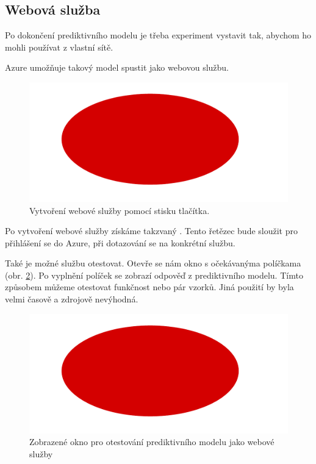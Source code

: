 \documentclass[thesis=M,czech]{FITthesis}[2012/10/20]
\begin{document}
		\subsection{Webová služba}
			Po dokončení prediktivního modelu je třeba experiment vystavit tak, abychom ho mohli používat z vlastní sítě.
			
			Azure umožňuje takový model spustit jako webovou službu.
			
			  \begin{figure}[htb]\centering
			  	\includegraphics[width=\textwidth]{./img/todo}
			  	\caption{Vytvoření webové služby pomocí stisku tlačítka.}
			  	\label{fig:azure_create_web_servise}
			  \end{figure}
		  
		  Po vytvoření webové služby získáme takzvaný . Tento řetězec bude sloužit pro přihlášení se do Azure, při dotazování se na konkrétní službu.
		  
		  Také je možné službu otestovat. Otevře se nám okno s očekávanýma políčkama (obr. \ref{fig:azure_test_web_service}). Po vyplnění políček se zobrazí odpověď z prediktivního modelu. Tímto způsobem můžeme otestovat funkčnost nebo pár vzorků. Jiná použití by byla velmi časově a zdrojově nevýhodná.
		  
		  \begin{figure}[htb]\centering
		  	\includegraphics[width=\textwidth]{./img/todo}
		  	\caption{Zobrazené okno pro otestování prediktivního modelu jako webové služby}
		  	\label{fig:azure_test_web_service}
		  \end{figure}
	
\end{document}
